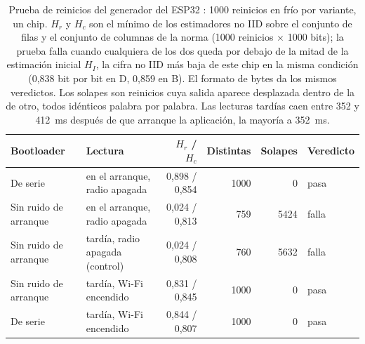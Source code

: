 \begin{table}[htbp]
\centering
\caption{Prueba de reinicios del generador del ESP32 \meas{}: 1000 reinicios
en frío por variante, un chip. $H_r$ y $H_c$ son el mínimo de los
estimadores no IID sobre el conjunto de filas y el conjunto de columnas de
la norma (1000 reinicios $\times$ 1000 bits); la prueba falla cuando
cualquiera de los dos queda por debajo de la mitad de la estimación
inicial $H_I$, la cifra no IID más baja de este chip en la misma condición
(0,838 bit por bit en D, 0,859 en B). El formato de bytes da los mismos
veredictos. Los solapes son reinicios cuya salida aparece desplazada
dentro de la de otro, todos idénticos palabra por palabra. Las lecturas
tardías caen entre 352 y 412~ms después de que arranque la aplicación, la
mayoría a 352~ms.}
\label{tab:esp32_restart}
\footnotesize
\begin{tabular}{@{}llrrrl@{}}
\toprule
Bootloader & Lectura & $H_r$ / $H_c$ & Distintas & Solapes & Veredicto \\
\midrule
De serie & en el arranque, radio apagada & 0,898 / 0,854 & 1000 & 0 & pasa \\
Sin ruido de arranque & en el arranque, radio apagada & 0,024 / 0,813 & 759 & 5424 & falla \\
Sin ruido de arranque & tardía, radio apagada (control) & 0,024 / 0,808 & 760 & 5632 & falla \\
Sin ruido de arranque & tardía, Wi-Fi encendido & 0,831 / 0,845 & 1000 & 0 & pasa \\
De serie & tardía, Wi-Fi encendido & 0,844 / 0,807 & 1000 & 0 & pasa \\
\bottomrule
\end{tabular}
\end{table}

